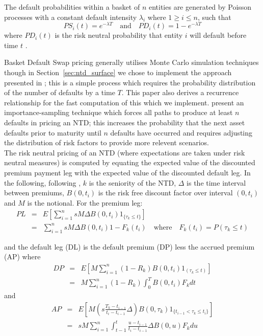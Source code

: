 The default probabilities within a basket of $n$ entities are generated by Poisson processes with a constant default intensity $\lambda_i$ where $1 \geq i \leq n$, such that
\[
	PS_i(t) = e^{-\lambda T} \quad \mbox{and} \quad PD_i(t) = 1 - e^{-\lambda T}
\]
where $PD_i(t)$ is the risk neutral probability that entity $i$ will default before time $t$ \cite{hw2004}.


Basket Default Swap pricing generally utilises Monte Carlo simulation techniques though in Section~\ref{sec:ntd_surface} we chose to implement the approach presented in \cite{hw2004};
this is a simple process which requires the probability distribution of the number of defaults by a time $T$. This paper also derives a recurrence relationship for the fast computation of this which we implement. \cite{cg2008} present an importance-sampling technique which forces all paths to produce at least $n$ defaults in pricing an
NTD; this increases the probability that the next asset defaults prior to maturity until
$n$ defaults have occurred and requires adjusting the distribution of risk factors to provide more relevent scenarios.\\

The risk neutral pricing of an NTD (where expectations are taken under risk neutral measures) is computed by equating the expected value of the discounted premium payment leg with the expected value of the discounted default leg. In the following, following \cite{Gal03}, $k$ is the seniority of the NTD, $\Delta$ is the time interval between premiums,  $B(0,t_i)$ is the risk free discount factor over interval $(0,t_i)$ and $M$ is the notional. For the premium leg:
\begin{eqnarray}\label{ntd_pl}
 PL & = & E \left[ \sum_{i=1}^n s M \Delta B(0,t_i) 1_{\{\tau_k \leq t\}} \right] \nonumber\\
 & =	& \sum_{i=1}^n s M \Delta B(0,t_i) 1 - F_{k} (t_i) \quad\mbox{where}\quad F_{k} (t_i) = P(\tau_k \leq t)
\end{eqnarray}

and the default leg (DL) is the default premium (DP) less the accrued premium (AP) where
\begin{eqnarray}\label{ntd_dp}
 DP & = &  E \left[M \sum_{i=1}^n (1-R_k) B(0,t_i) 1_{(\tau_k \leq t)} \right] \nonumber\\
 & = &	M \sum_{i=1}^n (1-R_k) \int^T_0 B(0,t_i) F_k dt
\end{eqnarray} 
and
\begin{eqnarray}\label{ntd_ap}
 AP & = & E \left[M \left( s \frac{T_k - t_{i-1}}{t_i - t_{i-1}}  \Delta \right) B(0,\tau_k) 1_{\{t_{i-1} < \tau_k \leq t_i\}} \right] \nonumber\\
&  = & s M \sum_{i=1}^n \int^t_{t-1} \frac{u - t_{i-1}}{t_i - t_{i-1}} \Delta B(0,u) F_k du
\end{eqnarray} 

